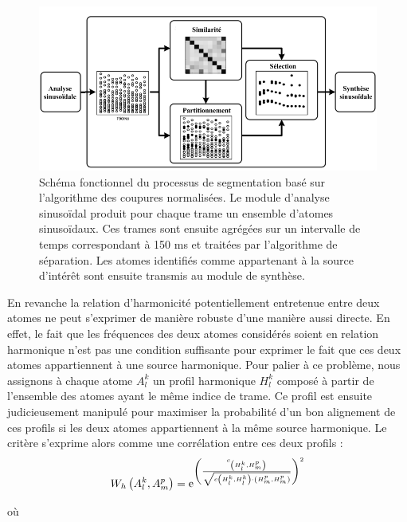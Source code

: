 \begin{figure}[t]
  \includegraphics[width=1\textwidth]{figures/ncutDiagramFr.png}
  \caption{Schéma fonctionnel du processus de segmentation basé sur l'algorithme des coupures normalisées. Le module d'analyse sinusoïdal produit pour chaque trame un ensemble d'atomes sinusoïdaux. Ces trames sont ensuite agrégées sur un intervalle de temps correspondant à 150 ms et traitées par l'algorithme de séparation. Les atomes identifiés comme appartenant à la source d'intérêt sont ensuite transmis au module de synthèse.}  \label{fig:ncut}
\end{figure}

En revanche la relation d'harmonicité potentiellement entretenue entre deux atomes ne peut s'exprimer de manière robuste d'une manière aussi directe. En effet, le fait que les fréquences des deux atomes considérés soient en relation harmonique n'est pas une condition suffisante pour exprimer le fait que ces deux atomes appartiennent à une source harmonique. Pour palier à ce problème, nous assignons à chaque atome $A _ { l } ^ { k }$ un profil harmonique $H _ { l } ^ { k }$ composé à partir de l'ensemble des atomes ayant le même indice de trame. Ce profil est ensuite judicieusement manipulé pour maximiser la probabilité d'un bon alignement de ces profils si les deux atomes appartiennent à la même source harmonique\cite{lagrangeTaslp08}. Le critère s'exprime alors comme une corrélation entre ces deux profils :
\begin{equation}
  W _ { h } \left( A _ { l } ^ { k } , A _ { m } ^ { p } \right) = \operatorname{e}^{\left( \frac { c _ { \left( H _ { l } ^ { k } , H _ { m } ^ { p } \right) } } { \sqrt { c \left( H _ { l } ^ { k } , H _ { l } ^ { k } \right) \cdot \left( H _ { m } ^ { p } , H _ { m } ^ { p } \right) } } \right) ^ { 2 } }
\end{equation}

où

